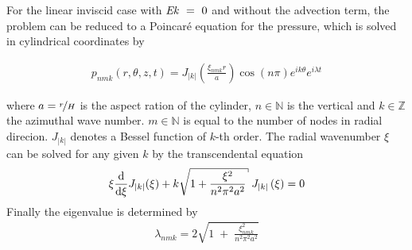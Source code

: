 For the linear inviscid case with $\mbox{\textit{Ek}}~=~0$ and without the advection term, the problem can be reduced to a Poincar\'{e} equation for the pressure,
which is solved in cylindrical coordinates by

\begin{align}
    p_{nmk}(r, \theta, z, t) = J_{|k|}\left(\frac{\xi_{nmk}r}{a} \right)\cos(n\pi)e^{ik\theta}e^{i\lambda t}
\end{align}

where $a=\nicefrac{r}{H}$ is the aspect ration of the cylinder,
$n\in\mathbb{N}$ is the vertical and $k\in\mathbb{Z}$ the azimuthal wave number.
$m\in\mathbb{N}$ is equal to the number of nodes in radial direcion.
$J_{|k|}$ denotes a Bessel function of $k$-th order.
The radial wavenumber $\xi$  can be solved for any given $k$ by the transcendental equation
\begin{align}
    \xi \frac{\dif}{\dif \xi}J_{|k|}(\xi) + k \sqrt{1 + \frac{\xi^2}{n^2\pi^2a^2}} \; J_{|k|}\left(\xi\right) = 0
\end{align}
Finally the eigenvalue is determined by
\begin{align}
    \lambda_{nmk} = 2\sqrt{1 \; + \;\frac{ \xi_{nmk}^2}{n^2\pi^2a^2}}
\end{align}

%
%
%



